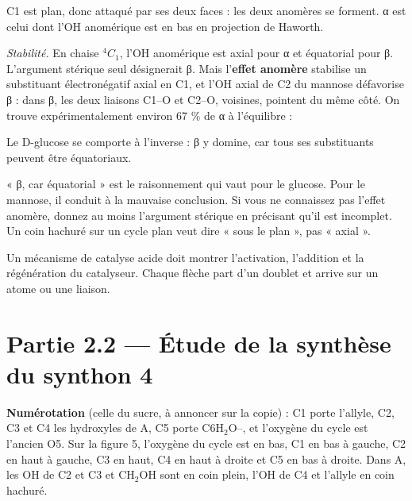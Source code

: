\documentclass[11pt,a4paper]{article}
\newcommand{\equationajustee}[1]{%
  \sbox{\boiteequation}{$\displaystyle #1$}%
  \ifdim\wd\boiteequation>\linewidth
    \[\resizebox{\linewidth}{!}{\usebox{\boiteequation}}\]%
  \else
    \[#1\]%
  \fi}
\begin{document}
C1 est plan, donc attaqué par ses deux faces : les deux anomères se forment. α est celui dont l'OH anomérique est en bas en projection de Haworth.

\emph{Stabilité.} En chaise \({}^4C_1\), l'OH anomérique est axial pour α et équatorial pour β. L'argument stérique seul désignerait β. Mais l'\textbf{effet anomère} stabilise un substituant électronégatif axial en C1, et l'OH axial de C2 du mannose défavorise β : dans β, les deux liaisons C1--O et C2--O, voisines, pointent du même côté. On trouve expérimentalement environ 67 \% de α à l'équilibre :

\equationajustee{\boxed{\alpha\text{-D-mannopyranose plus stable}}}

Le D-glucose se comporte à l'inverse : β y domine, car tous ses substituants peuvent être équatoriaux.

\begin{piege}

« β, car équatorial » est le raisonnement qui vaut pour le glucose. Pour le mannose, il conduit à la mauvaise conclusion. Si vous ne connaissez pas l'effet anomère, donnez au moins l'argument stérique en précisant qu'il est incomplet. Un coin hachuré sur un cycle plan veut dire « sous le plan », pas « axial ».

\end{piege}

\begin{jury}

Un mécanisme de catalyse acide doit montrer l'activation, l'addition et la régénération du catalyseur. Chaque flèche part d'un doublet et arrive sur un atome ou une liaison.

\end{jury}

\hypertarget{partie-2.2-uxe9tude-de-la-synthuxe8se-du-synthon-4}{%
\section{Partie 2.2 --- Étude de la synthèse du synthon 4}\label{partie-2.2-uxe9tude-de-la-synthuxe8se-du-synthon-4}}

\textbf{Numérotation} (celle du sucre, à annoncer sur la copie) : C1 porte l'allyle, C2, C3 et C4 les hydroxyles de A, C5 porte \(\mathrm{C6H_2O}\)--, et l'oxygène du cycle est l'ancien O5. Sur la figure 5, l'oxygène du cycle est en bas, C1 en bas à gauche, C2 en haut à gauche, C3 en haut, C4 en haut à droite et C5 en bas à droite. Dans A, les OH de C2 et C3 et \(\mathrm{CH_2OH}\) sont en coin plein, l'OH de C4 et l'allyle en coin hachuré.
\end{document}
